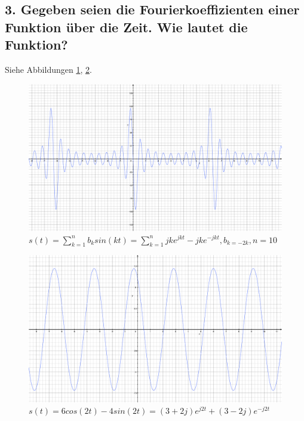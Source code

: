 \subsection*{3. Gegeben seien die Fourierkoeffizienten einer Funktion \"uber die Zeit. Wie lautet die Funktion?}
Siehe Abbildungen \ref{fig:3.3.a},  \ref{fig:3.3.b}.
\begin{figure}[h] %
   \centering
   \includegraphics[width=1.0\textwidth]{Uebung3/Aufgabe_3_3_a_1.pdf} 
   \caption{$s(t)=\sum_{k=1}^n b_{k}sin(kt)=\sum_{k=1}^{n} jke^{jkt}-jke^{-jkt}, b_{k=-2k}, n=10$}
   \label{fig:3.3.a}
\end{figure}
\begin{figure}[h] %
   \centering
   \includegraphics[width=1.0\textwidth]{Uebung3/Aufgabe_3_3_b.pdf} 
   \caption{$s(t)= 6cos(2t)-4sin(2t)=(3+2j)e^{j2t}+(3-2j)e^{-j2t}$}
   \label{fig:3.3.b}
\end{figure}